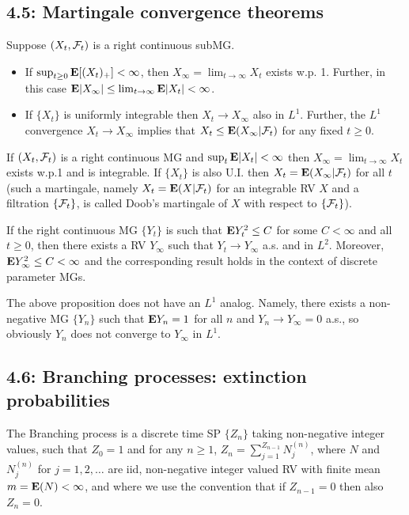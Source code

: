 \subsection*{4.5: Martingale convergence theorems}
\begin{theorem*} 
Suppose $(X_t, \mathcal{F}_t)$ is a right continuous subMG.
\begin{itemize}
\item If $\sup_{t \ge 0} \mathbf{E}[(X_t)_+] < \infty$, then $X_\infty =\lim_{t
\rightarrow \infty} X_t$ exists w.p. 1. Further, in this case $\mathbf{E}|X_\infty| \le
\lim_{t\rightarrow \infty} \mathbf{E}|X_t| < \infty$.

\item If $\{X_t\}$ is uniformly integrable then $X_t \rightarrow X_\infty$ also
in $L^1$. Further, the $L^1$ convergence $X_t \rightarrow X_\infty$ implies that
$X_t \le \mathbf{E}(X_\infty | \mathcal{F}_t)$ for any fixed $t \ge 0$.
\end{itemize}
\end{theorem*} 

\begin{corollary*} 
If $(X_t, \mathcal{F}_t)$ is a right continuous MG and $\sup_t \mathbf{E}|X_t| < \infty$ then
$X_\infty = \lim_{t\rightarrow \infty} X_t$ exists w.p.1 and is integrable. If
$\{X_t\}$ is also U.I. then $X_t = \mathbf{E}(X_\infty | \mathcal{F}_t)$ for all $t$ (such a
martingale, namely $X_t = \mathbf{E}(X | \mathcal{F}_t)$ for an integrable RV $X$ and a
filtration $\{\mathcal{F}_t\}$, is called Doob's martingale of $X$ with respect to
$\{\mathcal{F}_t\}$).
\end{corollary*} 

\begin{proposition*} 
If the right continuous MG $\{Y_t\}$ is such that $\mathbf{E} Y_t^2 \le C$ for some $C <
\infty$ and all $t \ge 0$, then there exists a RV $Y_\infty$ such that $Y_t
\rightarrow Y_\infty$ a.s. and in $L^2$. Moreover, $\mathbf{E} Y_\infty^2 \le C <
\infty$ and the corresponding result holds in the context of discrete parameter
MGs.
\end{proposition*} 

\begin{remark*} 
The above proposition does not have an $L^1$ analog. Namely, there exists a
non-negative MG $\{Y_n\}$ such that $\mathbf{E} Y_n = 1$ for all $n$ and $Y_n
\rightarrow Y_\infty = 0$ a.s., so obviously $Y_n$ does not converge to
$Y_\infty$ in $L^1$.
\end{remark*} 


\subsection*{4.6: Branching processes: extinction probabilities}
\begin{definition*}
The Branching process is a discrete time SP $\{Z_n\}$ taking non-negative
integer values, such that $Z_0 = 1$ and for any $n \ge 1$,
$Z_n = \sum_{j=1}^{Z_{n-1}} N_j^{(n)}$, where $N$ and $N_j^{(n)}$ for $j = 1, 2,
\dots$ are iid, non-negative integer valued RV with finite mean $m = \mathbf{E}(N) <
\infty$, and where we use the convention that if $Z_{n-1} = 0$ then also $Z_n =
0$.
\end{definition*} 

